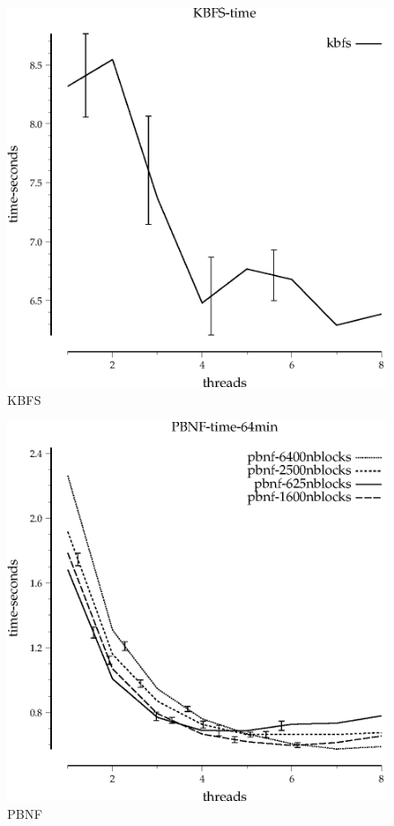 \documentclass{article}
\begin{document}

\begin{figure}
\begin{center}
\includegraphics{KBFS-time}
\end{center}
\caption{KBFS}
\end{figure}

\begin{figure}
\begin{center}
\includegraphics{PBNF-time-64min}
\end{center}
\caption{PBNF}
\end{figure}
\end{document}
